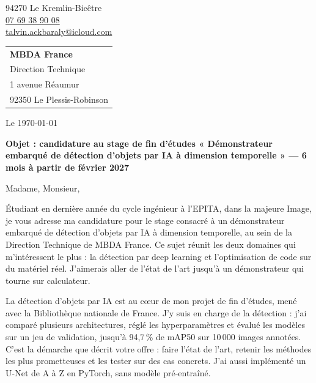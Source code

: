 \documentclass[11pt, a4paper]{extarticle}
\begin{document}
{\color{accent}\fontsize{22}{26}\selectfont\scshape{}}\par\vspace{3pt}
{\setlength{\parskip}{0pt}
94270 Le Kremlin-Bicêtre\\
\href{tel:+33769389008}{\textcolor{ink}{07 69 38 90 08}}\\
\href{mailto:talvin.ackbaraly@icloud.com}{\textcolor{ink}{talvin.ackbaraly@icloud.com}}\par}
\vspace{-4pt}{\color{hair}\rule{\textwidth}{0.4pt}}\par

\vspace{2pt}
\hfill\begin{tabular}[t]{@{}l@{}}
  \textbf{MBDA France}\\
  Direction Technique\\
  1 avenue Réaumur\\
  92350 Le Plessis-Robinson
\end{tabular}

Le \today

\vspace{2pt}
\textbf{Objet : candidature au stage de fin d'études « Démonstrateur embarqué de détection d'objets
par IA à dimension temporelle » — 6 mois à partir de février 2027}

\vspace{2pt}
Madame, Monsieur,


\justifying
Étudiant en dernière année du cycle ingénieur à l'EPITA, dans la majeure Image, je vous adresse
ma candidature pour le stage consacré à un démonstrateur embarqué de détection d'objets par IA
à dimension temporelle, au sein de la Direction Technique de MBDA France. Ce sujet réunit les
deux domaines qui m'intéressent le plus : la détection par deep learning et l'optimisation de
code sur du matériel réel. J'aimerais aller de l'état de l'art jusqu'à un démonstrateur qui
tourne sur calculateur.

La détection d'objets par IA est au cœur de mon projet de fin d'études, mené avec la
Bibliothèque nationale de France. J'y suis en charge de la détection : j'ai comparé plusieurs
architectures, réglé les hyperparamètres et évalué les modèles sur un jeu de validation, jusqu'à
94,7\,\% de mAP50 sur 10\,000 images annotées. C'est la démarche que décrit votre offre : faire
l'état de l'art, retenir les méthodes les plus prometteuses et les tester sur des cas concrets.
J'ai aussi implémenté un U-Net de A à Z en PyTorch, sans modèle pré-entraîné.
\end{document}
